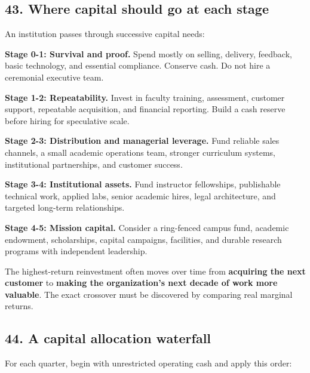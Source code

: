 \subsection{43. Where capital should go at each stage}

An institution passes through successive capital needs:

\textbf{Stage 0-1: Survival and proof.} Spend mostly on selling, delivery, feedback, basic technology, and essential compliance. Conserve cash. Do not hire a ceremonial executive team.

\textbf{Stage 1-2: Repeatability.} Invest in faculty training, assessment, customer support, repeatable acquisition, and financial reporting. Build a cash reserve before hiring for speculative scale.

\textbf{Stage 2-3: Distribution and managerial leverage.} Fund reliable sales channels, a small academic operations team, stronger curriculum systems, institutional partnerships, and customer success.

\textbf{Stage 3-4: Institutional assets.} Fund instructor fellowships, publishable technical work, applied labs, senior academic hires, legal architecture, and targeted long-term relationships.

\textbf{Stage 4-5: Mission capital.} Consider a ring-fenced campus fund, academic endowment, scholarships, capital campaigns, facilities, and durable research programs with independent leadership.

The highest-return reinvestment often moves over time from \textbf{acquiring the next customer} to \textbf{making the organization's next decade of work more valuable}. The exact crossover must be discovered by comparing real marginal returns.

\subsection{44. A capital allocation waterfall}

For each quarter, begin with unrestricted operating cash and apply this order:

